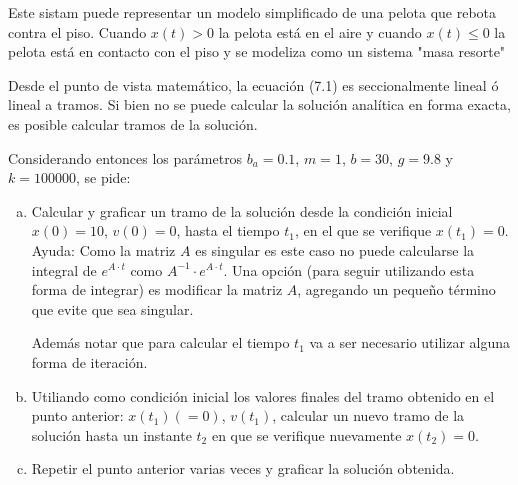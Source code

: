 \documentclass{article}
\begin{document}
Este sistam puede representar un modelo simplificado de una pelota que rebota contra el piso. Cuando $x(t) > 0$ la pelota está en el aire y cuando $x(t) \leq 0$ la pelota está en contacto con el piso y se modeliza como un sistema "masa resorte"

Desde el punto de vista matemático, la ecuación (7.1) es seccionalmente lineal ó lineal a tramos. Si bien no se puede calcular la solución analítica en forma exacta, es posible calcular tramos de la solución.

Considerando entonces los parámetros $b_{a} = 0.1$, $m=1$, $b=30$, $g=9.8$ y $k = 100000$, se pide:
\begin{enumerate}[a)]
\item Calcular y graficar un tramo de la solución desde la condición inicial $x(0)=10$, $v(0)=0$, hasta el tiempo $t_{1}$, en el que se verifique $x(t_{1})=0$.
Ayuda: Como la matriz $A$ es singular es este caso no puede calcularse la integral de $e^{A \cdot t}$ como $A^{-1} \cdot e^{A \cdot t}$. Una opción (para seguir utilizando esta forma de integrar) es modificar la matriz $A$, agregando un pequeño término que evite que sea singular.

Además notar que para calcular el tiempo $t_{1}$ va a ser necesario utilizar alguna forma de iteración.

\item Utiliando como condición inicial los valores finales del tramo obtenido en el punto anterior: $x(t_{1})(=0)$, $v(t_{1})$, calcular un nuevo tramo de la solución hasta un instante $t_{2}$ en que se verifique nuevamente $x(t_{2})=0$.

\item Repetir el punto anterior varias veces y graficar la solución obtenida.
\end{enumerate}
\end{document}
